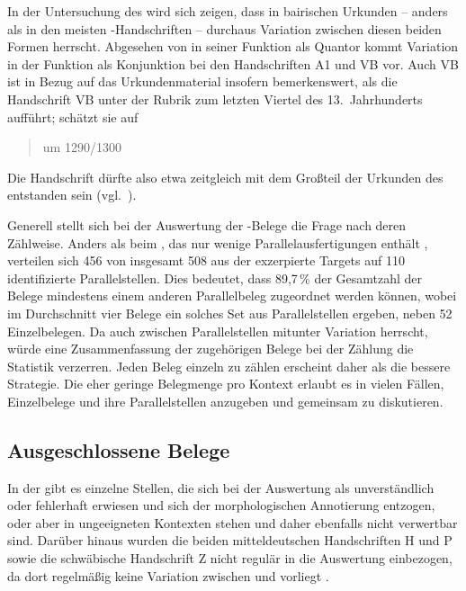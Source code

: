 In der Untersuchung des \CAO{} wird sich zeigen, dass in
bairischen Urkunden -- anders als in den meisten
\KC{}-Handschriften -- durchaus Variation zwischen diesen beiden Formen
herrscht. Abgesehen von  in seiner Funktion als Quantor kommt
Variation in der Funktion als Konjunktion bei den Handschriften A1 und VB vor.
Auch VB ist in Bezug auf das Urkundenmaterial insofern bemerkenswert, als
\citet[224]{schneider1987} die Handschrift VB unter der Rubrik zum letzten
Viertel des 13.~Jahrhunderts aufführt; \citeauthor{wolf:kckat} schätzt sie auf
\blockcquote[65]{wolf:kckat}{um 1290/1300}. Die Handschrift dürfte also etwa
zeitgleich mit dem Großteil der Urkunden des \CAO{} entstanden sein
(vgl.~).

Generell stellt sich bei der Auswertung der \KC{}-Belege die Frage nach deren
Zählweise. Anders als beim \CAO{}, das nur wenige Parallelausfertigungen
enthält \autocite[vgl.][326--328]{ganslmayeretal2003}, verteilen sich 456 von
insgesamt 508 aus der \KC{} exzerpierte Targets auf 110 identifizierte
Parallelstellen. Dies bedeutet, dass 89,7\,\% der Gesamtzahl der Belege
mindestens einem anderen Parallelbeleg zugeordnet werden können, wobei im
Durchschnitt vier Belege ein solches Set aus Parallelstellen ergeben, neben 52
Einzelbelegen. Da auch zwischen Parallelstellen mitunter Variation herrscht,
würde eine Zusammenfassung der zugehörigen Belege bei der Zählung die Statistik
verzerren. Jeden Beleg einzeln zu zählen erscheint daher als die bessere
Strategie. Die eher geringe Belegmenge pro Kontext erlaubt es in vielen Fällen,
Einzelbelege und ihre Parallelstellen anzugeben und gemeinsam zu diskutieren.

\subsection{Ausgeschlossene Belege}
\label{subsec:ausgeschlossene_kc}

In der \KC{} gibt es einzelne Stellen, die sich bei der Auswertung als
unverständlich oder fehlerhaft erwiesen und sich der morphologischen
Annotierung entzogen, oder aber in ungeeigneten Kontexten stehen und daher
ebenfalls nicht verwertbar sind. Darüber hinaus wurden die beiden
mitteldeutschen Handschriften H und P sowie die
schwäbische Handschrift Z nicht regulär in die Auswertung
einbezogen, da dort regelmäßig keine Variation zwischen  und
 vorliegt \autocite[vgl. auch][183]{ksw2}.

